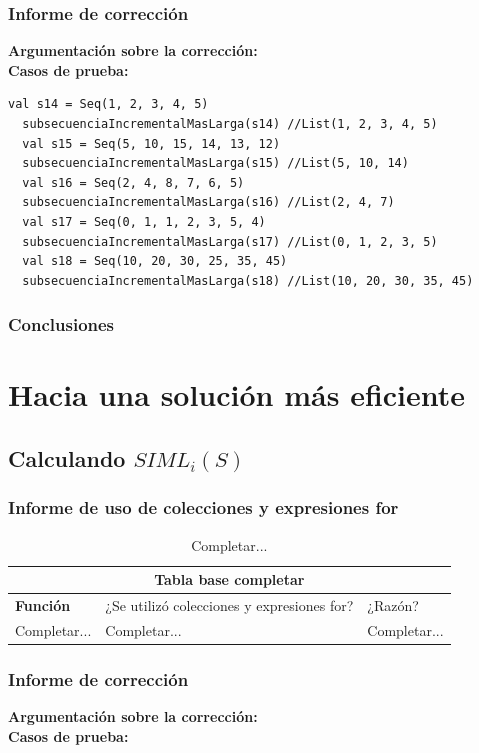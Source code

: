 \documentclass[12pt, a4paper]{article}
\begin{document}
\subsubsection{Informe de corrección}
\textbf{Argumentación sobre la corrección: \\}
\textbf{Casos de prueba: \\}
\begin{lstlisting}[caption=Casos de prueba para la función subsecuenciaIncrementalMasLarga, label=lst:scala_code]
  val s14 = Seq(1, 2, 3, 4, 5)
  subsecuenciaIncrementalMasLarga(s14) //List(1, 2, 3, 4, 5)
  val s15 = Seq(5, 10, 15, 14, 13, 12)
  subsecuenciaIncrementalMasLarga(s15) //List(5, 10, 14)
  val s16 = Seq(2, 4, 8, 7, 6, 5)
  subsecuenciaIncrementalMasLarga(s16) //List(2, 4, 7)
  val s17 = Seq(0, 1, 1, 2, 3, 5, 4)
  subsecuenciaIncrementalMasLarga(s17) //List(0, 1, 2, 3, 5)
  val s18 = Seq(10, 20, 30, 25, 35, 45)
  subsecuenciaIncrementalMasLarga(s18) //List(10, 20, 30, 35, 45)
\end{lstlisting}
\subsubsection{Conclusiones}
\section{Hacia una solución más eficiente}
\subsection{Calculando $SIML_i(S)$}
\subsubsection{Informe de uso de colecciones y expresiones for}
\begin{table}[H]
    \scriptsize
   \begin{tabular}{ |p{4cm}|p{3cm}|p{5.5cm}|  }
    \hline
    \multicolumn{3}{|c|}{Tabla base completar} \\
    \hline
    \textbf{Función}& ¿Se utilizó colecciones y expresiones for?  & ¿Razón?\\
    \hline
     Completar... & Completar... &  Completar... \\
     \hline
   \end{tabular}
   \centering
   \caption{Completar...}
   \end{table}
\subsubsection{Informe de corrección}
\textbf{Argumentación sobre la corrección: \\}
\textbf{Casos de prueba: \\}
\end{document}
